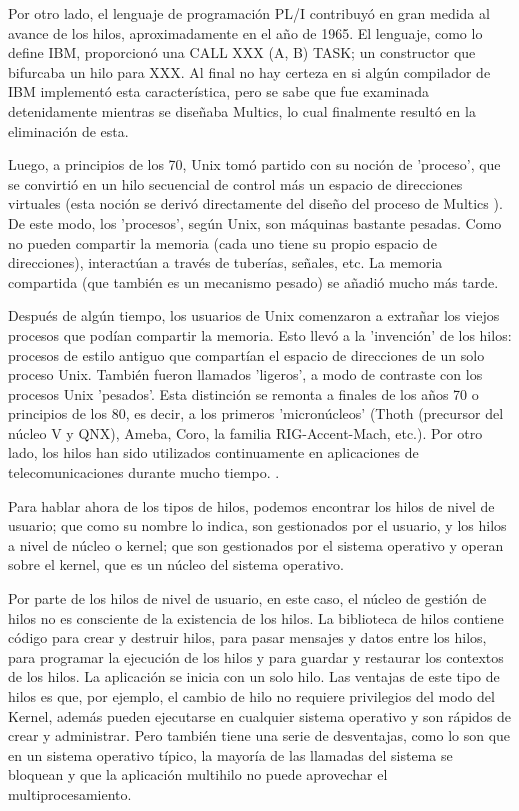 \documentclass[12pt]{article}
\begin{document}
{Por otro lado, el lenguaje de programación PL/I contribuyó en gran medida al avance de los hilos, aproximadamente en el año de 1965. El lenguaje, como lo define IBM, proporcionó una CALL XXX (A, B) TASK; un constructor que bifurcaba un hilo para XXX. Al final no hay certeza en si algún compilador de IBM implementó esta característica, pero se sabe que fue examinada detenidamente mientras se diseñaba Multics, lo cual finalmente resultó en la eliminación de esta.
\newline

Luego, a principios de los 70, Unix tomó partido con su noción de 'proceso', que se convirtió en un hilo secuencial de control más un espacio de direcciones virtuales (esta noción se derivó directamente del diseño del proceso de Multics ). De este modo, los 'procesos', según Unix, son máquinas bastante pesadas. Como no pueden compartir la memoria (cada uno tiene su propio espacio de direcciones), interactúan a través de tuberías, señales, etc. La memoria compartida (que también es un mecanismo pesado) se añadió mucho más tarde.
\newline

Después de algún tiempo, los usuarios de Unix comenzaron a extrañar los viejos procesos que podían compartir la memoria. Esto llevó a la 'invención' de los hilos: procesos de estilo antiguo que compartían el espacio de direcciones de un solo proceso Unix. También fueron llamados 'ligeros', a modo de contraste con los procesos Unix 'pesados'. Esta distinción se remonta a finales de los años 70 o principios de los 80, es decir, a los primeros 'micronúcleos' (Thoth (precursor del núcleo V y QNX), Ameba, Coro, la familia RIG-Accent-Mach, etc.).
Por otro lado, los hilos han sido utilizados continuamente en aplicaciones de telecomunicaciones durante mucho tiempo.
\citep{Hist}.
\newline

Para hablar ahora de los tipos de hilos, podemos encontrar los hilos de nivel de usuario; que como su nombre lo indica, son gestionados por el usuario, y los hilos a nivel de núcleo o kernel; que son gestionados por el sistema operativo y operan sobre el kernel, que es un núcleo del sistema operativo.
\newline

Por parte de los hilos de nivel de usuario, en este caso, el núcleo de gestión de hilos no es consciente de la existencia de los hilos. La biblioteca de hilos contiene código para crear y destruir hilos, para pasar mensajes y datos entre los hilos, para programar la ejecución de los hilos y para guardar y restaurar los contextos de los hilos. La aplicación se inicia con un solo hilo. Las ventajas de este tipo de hilos es que, por ejemplo, el cambio de hilo no requiere privilegios del modo del Kernel, además pueden ejecutarse en cualquier sistema operativo y son rápidos de crear y administrar. Pero también tiene una serie de desventajas, como lo son que en un sistema operativo típico, la mayoría de las llamadas del sistema se bloquean y que la aplicación multihilo no puede aprovechar el multiprocesamiento.
\newline

}
\end{document}
